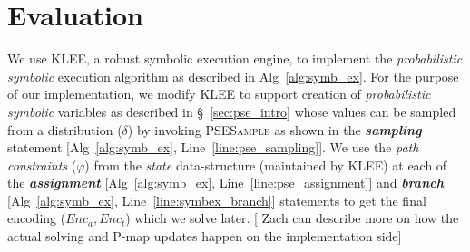 \section{Evaluation}
\label{sec:eval}
We use \textsc{KLEE}\cite{cadar2008}, a robust symbolic execution engine, to implement the \textit{probabilistic symbolic} execution algorithm as described in Alg~\ref{alg:symb_ex}. For the purpose of our implementation, we modify \textsc{KLEE} to support creation of \textit{probabilistic symbolic} variables as described in \S~\ref{sec:pse_intro} whose values can be sampled from a distribution ($\delta$) by invoking \textsc{PSESample} as shown in the \textbf{\textit{sampling}} statement [Alg~\ref{alg:symb_ex}, Line~\ref{line:pse_sampling}]. We use the  \textit{path constraints} ($\varphi$)  from the \textit{state} data-structure (maintained by \textsc{KLEE}) at each of the \textbf{\textit{assignment}} [Alg~\ref{alg:symb_ex}, Line~\ref{line:pse_assignment}] and \textbf{\textit{branch}} [Alg~\ref{alg:symb_ex}, Line~\ref{line:symbex_branch}] statements to get the final encoding ($Enc_a, Enc_t$)  which we solve later. [{\color{red} Zach can describe more on how the actual solving and P-map updates happen on the implementation side}]